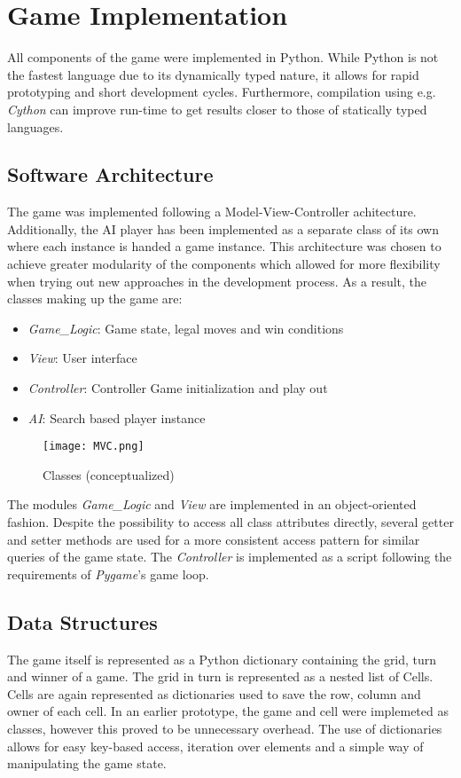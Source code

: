 \section{Game Implementation}

All components of the game were implemented in Python. While Python is not the fastest language due to its dynamically typed nature, it allows for rapid prototyping and short development cycles. Furthermore, compilation using e.g. \textit{Cython} can improve run-time to get results closer to those of statically typed languages.

\subsection{Software Architecture}

The game was implemented following a Model-View-Controller achitecture. Additionally, the AI player has been implemented as a separate class of its own where each instance is handed a game instance. This architecture was chosen to achieve greater modularity of the components which allowed for more flexibility when trying out new approaches in the development process. As a result, the classes making up the game are:

\begin{itemize}
    \item \textit{Game\_Logic}: Game state, legal moves and win conditions
    \item \textit{View}: User interface
    \item \textit{Controller}: Controller Game initialization and play out
    \item \textit{AI}: Search based player instance
\end{itemize}

\begin{figure}[h]
    \centering
    \texttt{[image: MVC.png]}
    \caption{Classes (conceptualized)}
\end{figure}

The modules \textit{Game\_Logic} and \textit{View} are implemented in an object-oriented fashion. Despite the possibility to access all class attributes directly, several getter and setter methods are used for a more consistent access pattern for similar queries of the game state. The \textit{Controller} is implemented as a script following the requirements of \textit{Pygame}'s game loop. 


\subsection{Data Structures}
The game itself is represented as a Python dictionary containing the grid, turn and winner of a game. The grid in turn is represented as a nested list of Cells. Cells are again represented as dictionaries used to save the row, column and owner of each cell. In an earlier prototype, the game and cell were implemeted as classes, however this proved to be unnecessary overhead. The use of dictionaries allows for easy key-based access, iteration over elements and a simple way of manipulating the game state.

